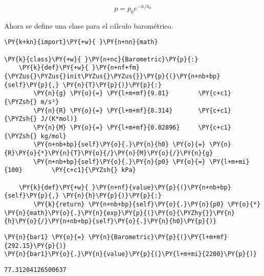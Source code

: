 \begin{equation}
    p = p_0e^{-h/h_0}
    \label{eq:formulaGeneralBarométrica2}
\end{equation}


Ahora se define una clase para el cálculo barométrico.

\begin{tcolorbox}[breakable, size=fbox, boxrule=1pt, pad at break*=1mm,colback=cellbackground, colframe=cellborder]
\begin{Verbatim}[commandchars=\\\{\}]
\PY{k+kn}{import}\PY{+w}{ }\PY{n+nn}{math} 

\PY{k}{class}\PY{+w}{ }\PY{n+nc}{Barometric}\PY{p}{:}
    \PY{k}{def}\PY{+w}{ }\PY{n+nf+fm}{\PYZus{}\PYZus{}init\PYZus{}\PYZus{}}\PY{p}{(}\PY{n+nb+bp}{self}\PY{p}{,} \PY{n}{T}\PY{p}{)}\PY{p}{:}
        \PY{n}{g} \PY{o}{=} \PY{l+m+mf}{9.81}        \PY{c+c1}{\PYZsh{} m/s²}
        \PY{n}{R} \PY{o}{=} \PY{l+m+mf}{8.314}       \PY{c+c1}{\PYZsh{} J/(K*mol)}
        \PY{n}{M} \PY{o}{=} \PY{l+m+mf}{0.02896}     \PY{c+c1}{\PYZsh{} kg/mol}
        \PY{n+nb+bp}{self}\PY{o}{.}\PY{n}{h0} \PY{o}{=} \PY{n}{R}\PY{o}{*}\PY{n}{T}\PY{o}{/}\PY{n}{M}\PY{o}{/}\PY{n}{g}
        \PY{n+nb+bp}{self}\PY{o}{.}\PY{n}{p0} \PY{o}{=} \PY{l+m+mi}{100}        \PY{c+c1}{\PYZsh{} kPa}

    \PY{k}{def}\PY{+w}{ }\PY{n+nf}{value}\PY{p}{(}\PY{n+nb+bp}{self}\PY{p}{,} \PY{n}{h}\PY{p}{)}\PY{p}{:}
        \PY{k}{return} \PY{n+nb+bp}{self}\PY{o}{.}\PY{n}{p0} \PY{o}{*} \PY{n}{math}\PY{o}{.}\PY{n}{exp}\PY{p}{(}\PY{o}{\PYZhy{}}\PY{n}{h}\PY{o}{/}\PY{n+nb+bp}{self}\PY{o}{.}\PY{n}{h0}\PY{p}{)}
\end{Verbatim}
\end{tcolorbox}

\begin{tcolorbox}[breakable, size=fbox, boxrule=1pt, pad at break*=1mm,colback=cellbackground, colframe=cellborder]
\begin{Verbatim}[commandchars=\\\{\}]
\PY{n}{bar1} \PY{o}{=} \PY{n}{Barometric}\PY{p}{(}\PY{l+m+mf}{292.15}\PY{p}{)}
\PY{n}{bar1}\PY{o}{.}\PY{n}{value}\PY{p}{(}\PY{l+m+mi}{2200}\PY{p}{)}
\end{Verbatim}
\end{tcolorbox}

\begin{tcolorbox}[breakable, size=fbox, boxrule=.5pt, pad at break*=1mm, opacityfill=0]
\begin{Verbatim}[commandchars=\\\{\}]
77.31204126500637
\end{Verbatim}
\end{tcolorbox}
        
